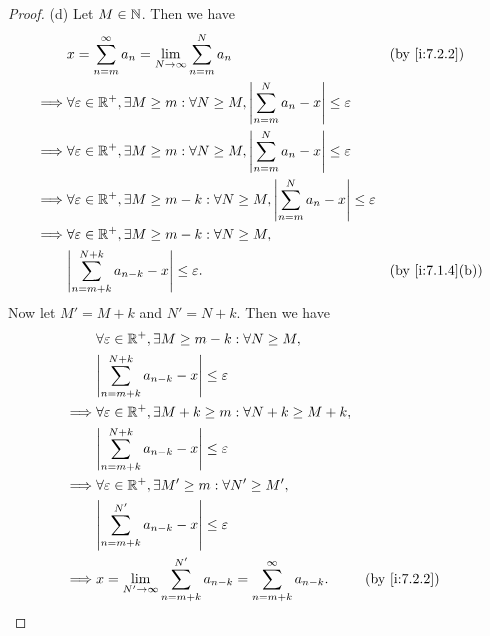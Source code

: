 \begin{proof}{(d)}
  Let \(M \in \mathbb{N}\).
  Then we have
  \begin{align*}
             & x = \sum_{n = m}^\infty a_n = \lim_{N \to \infty} \sum_{n = m}^N a_n                                                 &  & \by{i:7.2.2}    \\
    \implies & \forall \varepsilon \in \R^+, \exists M \geq m : \forall N \geq M, \abs{\sum_{n = m}^N a_n - x} \leq \varepsilon                          \\
    \implies & \forall \varepsilon \in \R^+, \exists M \geq m : \forall N \geq M, \abs{\sum_{n = m}^N a_n - x} \leq \varepsilon                          \\
    \implies & \forall \varepsilon \in \R^+, \exists M \geq m - k : \forall N \geq M, \abs{\sum_{n = m}^N a_n - x} \leq \varepsilon                      \\
    \implies & \forall \varepsilon \in \R^+, \exists M \geq m - k : \forall N \geq M,                                                                    \\
             & \abs{\sum_{n = m + k}^{N + k} a_{n - k} - x} \leq \varepsilon.                                                       &  & \by{i:7.1.4}[b]
  \end{align*}
  Now let \(M' = M + k\) and \(N' = N + k\).
  Then we have
  \begin{align*}
             & \forall \varepsilon \in \R^+, \exists M \geq m - k : \forall N \geq M,                                          \\
             & \abs{\sum_{n = m + k}^{N + k} a_{n - k} - x} \leq \varepsilon                                                   \\
    \implies & \forall \varepsilon \in \R^+, \exists M + k \geq m : \forall N + k \geq M + k,                                  \\
             & \abs{\sum_{n = m + k}^{N + k} a_{n - k} - x} \leq \varepsilon                                                   \\
    \implies & \forall \varepsilon \in \R^+, \exists M' \geq m : \forall N' \geq M',                                           \\
             & \abs{\sum_{n = m + k}^{N'} a_{n - k} - x} \leq \varepsilon                                                      \\
    \implies & x = \lim_{N' \to \infty} \sum_{n = m + k}^{N'} a_{n - k} = \sum_{n = m + k}^\infty a_{n - k}. &  & \by{i:7.2.2}
  \end{align*}
\end{proof}

